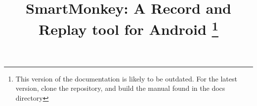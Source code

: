 \documentclass[10pt]{report}
\begin{document}
\title{SmartMonkey: A Record and Replay tool for Android
\footnote{This version of the documentation is likely to be outdated. For the latest version, clone the repository, and build the manual found in the docs directory}
}

\author{
} 


\maketitle
\tableofcontents
\newpage







\end{document}
